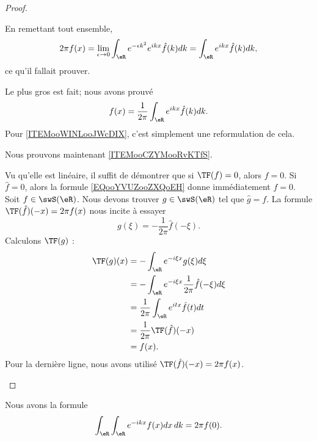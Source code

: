 \begin{proof}
\begin{subproof}
		En remettant tout ensemble,
		\begin{equation}
			2\pi f(x)=\lim_{\epsilon\to 0}\int_{\eR} e^{-\epsilon k^2} e^{ikx}\hat f(k)dk=\int_{\eR} e^{ikx}\hat f(k)dk,
		\end{equation}
		ce qu'il fallait prouver.
	\end{subproof}

	Le plus gros est fait; nous avons prouvé
	\begin{equation}        \label{EQooYVUZooZXQoEH}
		f(x)=\frac{1}{ 2\pi }\int_{\eR} e^{ikx}\hat f(k)dk.
	\end{equation}
	Pour \ref{ITEMooWINLooJWcDIX}, c'est simplement une reformulation de cela.

	Nous prouvons maintenant \ref{ITEMooCZYMooRvKTfS}.

	\begin{subproof}
		Vu qu'elle est linéaire, il suffit de démontrer que si \( \TF(f)=0\), alors \( f=0\). Si \( \hat f=0\), alors la formule \eqref{EQooYVUZooZXQoEH} donne immédiatement \( f=0\).
		Soit \( f\in \swS(\eR)\). Nous devons trouver \( g\in\swS(\eR)\) tel que \( \hat g=f\). La formule \( \TF(\hat f)(-x)=2\pi f(x)\) nous incite à essayer
		\begin{equation}
			g(\xi)=-\frac{1}{ 2\pi }\hat f(-\xi).
		\end{equation}
		Calculons \( \TF(g)\) :
		\begin{subequations}
			\begin{align}
				\TF(g)(x) & =-\int_{\eR} e^{-i\xi x}g(\xi)d\xi                       \\
				          & =-\int_{\eR} e^{-i\xi x}\frac{1}{ 2\pi }\hat f(-\xi)d\xi \\
				          & =\frac{1}{ 2\pi }\int_{\eR} e^{itx}\hat f(t)dt           \\
				          & =\frac{1}{ 2\pi }\TF(\hat f)(-x)                         \\
				          & =f(x).
			\end{align}
		\end{subequations}
		Pour la dernière ligne, nous avons utilisé \( \TF(\hat f)(-x)=2\pi f(x)\).
	\end{subproof}


\end{proof}

\begin{corollary}       \label{CORooAZLZooSviTej}
	Nous avons la formule
	\begin{equation}        \label{EQooRJXRooElEMAa}
		\int_{\eR}\int_{\eR} e^{-ikx}f(x)dx\,dk=2\pi f(0).
	\end{equation}
\end{corollary}

